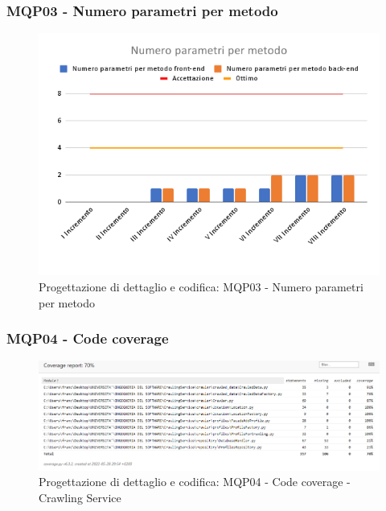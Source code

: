 \subsubsection{MQP03 - Numero parametri per metodo}
\begin{figure}[H]
    \centering
    \includegraphics[scale=0.50]{Sezioni/images/pb prodotto/Numero parametri per metodo.png}
    \caption{Progettazione di dettaglio e codifica: MQP03 - Numero parametri per metodo}
\end{figure}
\subsubsection{MQP04 - Code coverage}
\begin{figure}[H]
    \centering
    \includegraphics[scale=0.50]{Sezioni/images/pb prodotto/coverage-CS.PNG}
    \caption{Progettazione di dettaglio e codifica: MQP04 - Code coverage - Crawling Service}
\end{figure}


